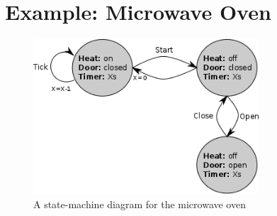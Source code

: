 
\section{Example: Microwave Oven}
\begin{figure}[!t]
\centering
\includegraphics[width=0.75\textwidth]{../images/microwave.png}
\caption{A state-machine diagram for the microwave oven}
\end{figure}

